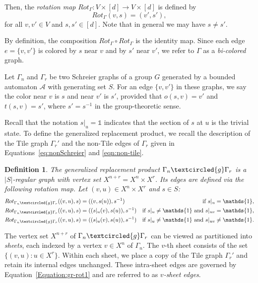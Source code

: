 \documentclass{article}
\newtheorem{mydef}{Definition}[section]
\newcommand{\A}{\mathcal{A}}
\newcommand{\G}{\Gamma}
\newcommand{\id}{\mathds{1}}
\newcommand{\g}{\textcircled{g}}
\begin{document}
Then, the \emph{rotation map} $Rot_{\G} : V \times [d] \to V \times [d]$ is defined by
$$Rot_{\G}(v, s) = (v', s'),$$
for all $v, v' \in V$ and $s, s' \in [d]$. Note that in general we may have $s \ne s'$.

By definition, the composition $Rot_{\G} \circ Rot_{\G}$ is the identity map. Since each edge $e = \{v, v'\}$ is colored by $s$ near $v$ and by $s'$ near $v'$, we refer to $\G$ as a \emph{bi-colored} graph.

Let $\G_n$ and $\G_r$ be two Schreier graphs of a group $G$ generated by a bounded automaton $\A$ with generating set $S$. For an edge $\{v, v'\}$ in these graphs, we say the color near $v$ is $s$ and near $v'$ is $s'$, provided that $o(s, v) = v'$ and $t(s, v) = s'$, where $s' = s^{-1}$ in the group-theoretic sense.

Recall that the notation $s|_u = \id$ indicates that the section of $s$ at $u$ is the trivial state. To define the generalized replacement product, we recall the description of the Tile graph $\G_r'$ and the non-Tile edges of $\G_r$ given in Equations~\eqref{eq:nonSchreier} and \eqref{eqn:non-tile}.

\begin{mydef}  \label{Definition:gen-rep}
The \emph{generalized replacement product} $\G_n \g \G_r$ is a $|S|$-regular graph with vertex set $X^{n+r} = X^n \times X^r$. Its edges are defined via the following rotation map. Let $(v, u) \in X^n \times X^r$ and $s \in S$:
\begin{align}
\label{Equation:gr-rot1}
Rot_{\G_n \g \G_r}((v, u), s) &= ((v, s(u)), s^{-1}) & \textnormal{if } s|_u = \id, \\
\label{Equation:gr-rot2}
Rot_{\G_n \g \G_r}((v, u), s) &= ((s|_u(v), s(u)), s^{-1}) & \textnormal{if } s|_u \ne \id \textnormal{ and } s|_{uv} = \id, \\
\label{Equation:gr-rot3}
Rot_{\G_n \g \G_r}((v, u), s) &= ((s|_u(v), s(u)), s^{-1}) & \textnormal{if } s|_u \ne \id \textnormal{ and } s|_{uv} \ne \id.
\end{align} 
\end{mydef}

The vertex set $X^{n+r}$ of $\G_n \g \G_r$ can be viewed as partitioned into \emph{sheets}, each indexed by a vertex $v \in X^n$ of $\G_n$. The $v$-th sheet consists of the set $\{(v, u) : u \in X^r\}$. Within each sheet, we place a copy of the Tile graph $\G_r'$ and retain its internal edges unchanged. These intra-sheet edges are governed by Equation~\eqref{Equation:gr-rot1} and are referred to as \emph{$v$-sheet edges}.
\end{document}
